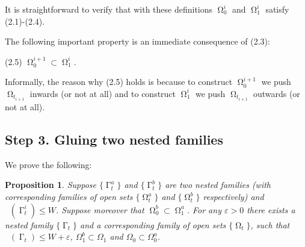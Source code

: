 \documentclass[12pt]{amsart}
\newtheorem{proposition}[theorem]{Proposition}
\DeclareMathOperator{\Hn}{\mathcal{H}^n}
\DeclareMathOperator{\G}{\Gamma}
\DeclareMathOperator{\Om}{\Omega}
\theoremstyle{definition}
\begin{document}

It is straightforward to verify that with these definitions
$\Om^i_0$ and $\Om^i_1$ satisfy (2.1)-(2.4).


The following important property is an immediate consequence of (2.3):

(2.5) $\Om^{i+1}_0 \subset \Om^{i}_1$.


Informally, the reason why (2.5) holds is because
to construct $\Om^{i+1}_0$ we push $\Om_{t_{i+1}}$ 
inwards (or not at all) and to construct $\Om^{i}_1$ we push
$\Om_{t_{i+1}}$ outwards (or not at all).


\subsection{Step 3. Gluing two nested families} 

We prove the following:

\begin{proposition} \label{gluing}
Suppose $\{\G_t^a\}$ and $\{\G_t^b\}$
are two nested families
(with corresponding families of open sets
 $\{\Om_t^a\}$ and $\{\Om_t^b\}$ respectively)
and $\Hn(\G_t^i) \leq W$. 
Suppose moreover that $\Om_0^b \subset \Om_1^a$.
For any $\varepsilon> 0$ there exists a nested family
$\{\G_t\}$ and a corresponding family 
of open sets $\{\Om_t\}$, such that 
$\Hn(\G_t) \leq W+ \varepsilon$,
$  \Omega_1 ^b \subset \Omega_1$
and $ \Omega_0 \subset \Omega_0 ^a$.
\end{proposition}


\end{document}
